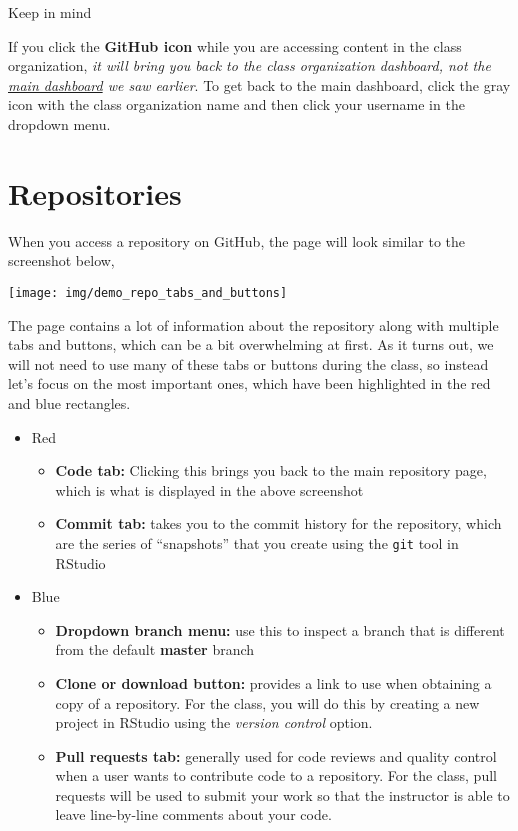 \documentclass[
]{book}
\providecommand{\tightlist}{%
  \setlength{\itemsep}{0pt}\setlength{\parskip}{0pt}}
\begin{document}
{Keep in mind}

If you click the \textbf{GitHub icon} while you are accessing content in the class organization, \emph{it will bring you back to the class organization dashboard, not the \protect\hyperlink{github-navigation-main-dashboard}{main dashboard} we saw earlier}.
To get back to the main dashboard, click the gray icon with the class organization name and then click your username in the dropdown menu.

\hypertarget{repositories}{%
\section{Repositories}\label{repositories}}

When you access a repository on GitHub, the page will look similar to the screenshot below,

\begin{center}\texttt{[image: img/demo\_repo\_tabs\_and\_buttons]} \end{center}

The page contains a lot of information about the repository along with multiple tabs and buttons, which can be a bit overwhelming at first.
As it turns out, we will not need to use many of these tabs or buttons during the class, so instead let's focus on the most important ones, which have been highlighted in the red and blue rectangles.

\begin{itemize}
\tightlist
\item
  Red

  \begin{itemize}
  \tightlist
  \item
    \textbf{Code tab:} Clicking this brings you back to the main repository page, which is what is displayed in the above screenshot
  \item
    \textbf{Commit tab:} takes you to the commit history for the repository, which are the series of ``snapshots'' that you create using the \texttt{git} tool in RStudio
  \end{itemize}
\item
  Blue

  \begin{itemize}
  \tightlist
  \item
    \textbf{Dropdown branch menu:} use this to inspect a branch that is different from the default \textbf{master} branch
  \item
    \textbf{Clone or download button:} provides a link to use when obtaining a copy of a repository. For the class, you will do this by creating a new project in RStudio using the \emph{version control} option.
  \item
    \textbf{Pull requests tab:} generally used for code reviews and quality control when a user wants to contribute code to a repository. For the class, pull requests will be used to submit your work so that the instructor is able to leave line-by-line comments about your code.
  \end{itemize}
\end{itemize}
\end{document}
